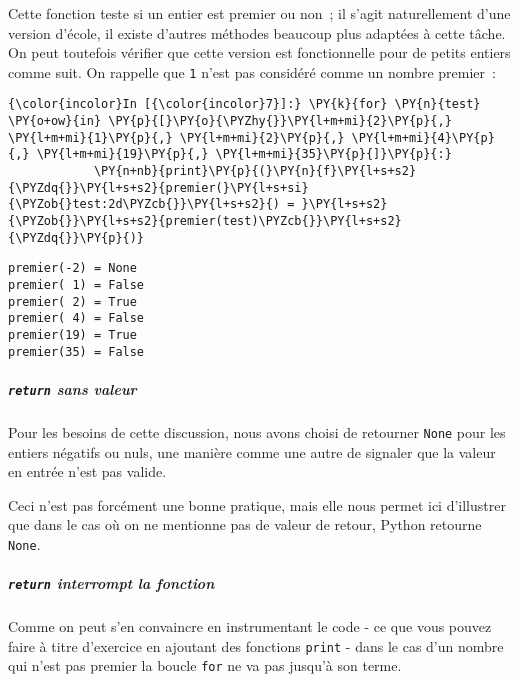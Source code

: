     Cette fonction teste si un entier est premier ou non~; il s'agit
naturellement d'une version d'école, il existe d'autres méthodes
beaucoup plus adaptées à cette tâche. On peut toutefois vérifier que
cette version est fonctionnelle pour de petits entiers comme suit. On
rappelle que \texttt{1} n'est pas considéré comme un nombre premier~:

    \begin{Verbatim}[commandchars=\\\{\},frame=single,framerule=0.3mm,rulecolor=\color{cellframecolor}]
{\color{incolor}In [{\color{incolor}7}]:} \PY{k}{for} \PY{n}{test} \PY{o+ow}{in} \PY{p}{[}\PY{o}{\PYZhy{}}\PY{l+m+mi}{2}\PY{p}{,} \PY{l+m+mi}{1}\PY{p}{,} \PY{l+m+mi}{2}\PY{p}{,} \PY{l+m+mi}{4}\PY{p}{,} \PY{l+m+mi}{19}\PY{p}{,} \PY{l+m+mi}{35}\PY{p}{]}\PY{p}{:}
            \PY{n+nb}{print}\PY{p}{(}\PY{n}{f}\PY{l+s+s2}{\PYZdq{}}\PY{l+s+s2}{premier(}\PY{l+s+si}{\PYZob{}test:2d\PYZcb{}}\PY{l+s+s2}{) = }\PY{l+s+s2}{\PYZob{}}\PY{l+s+s2}{premier(test)\PYZcb{}}\PY{l+s+s2}{\PYZdq{}}\PY{p}{)}
\end{Verbatim}


    \begin{Verbatim}[commandchars=\\\{\},frame=single,framerule=0.3mm,rulecolor=\color{cellframecolor}]
premier(-2) = None
premier( 1) = False
premier( 2) = True
premier( 4) = False
premier(19) = True
premier(35) = False
\end{Verbatim}

    \hypertarget{return-sans-valeur}{%
\subparagraph{\texorpdfstring{\texttt{return} sans
valeur}{return sans valeur}}\label{return-sans-valeur}}

    Pour les besoins de cette discussion, nous avons choisi de retourner
\texttt{None} pour les entiers négatifs ou nuls, une manière comme une
autre de signaler que la valeur en entrée n'est pas valide.

Ceci n'est pas forcément une bonne pratique, mais elle nous permet ici
d'illustrer que dans le cas où on ne mentionne pas de valeur de retour,
Python retourne \texttt{None}.

    \hypertarget{return-interrompt-la-fonction}{%
\subparagraph{\texorpdfstring{\texttt{return} interrompt la
fonction}{return interrompt la fonction}}\label{return-interrompt-la-fonction}}

    Comme on peut s'en convaincre en instrumentant le code - ce que vous
pouvez faire à titre d'exercice en ajoutant des fonctions \texttt{print}
- dans le cas d'un nombre qui n'est pas premier la boucle \texttt{for}
ne va pas jusqu'à son terme.

